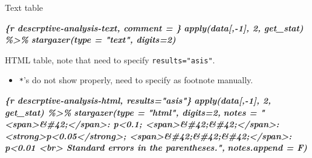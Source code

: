 \documentclass[
  a4paper,
  twoside,
  openright]{book}
\newenvironment{Shaded}{\begin{snugshade}}{\end{snugshade}}
\newcommand{\InformationTok}[1]{\textcolor[rgb]{0.56,0.35,0.01}{\textbf{\textit{#1}}}}
\providecommand{\tightlist}{%
  \setlength{\itemsep}{0pt}\setlength{\parskip}{0pt}}
\theoremstyle{definition}
\theoremstyle{definition}
\theoremstyle{definition}
\theoremstyle{definition}
\theoremstyle{remark}
\begin{document}
Text table

\begin{Shaded}
\begin{Highlighting}[]
\InformationTok{\textasciigrave{}\textasciigrave{}\textasciigrave{}\{r descrptive{-}analysis{-}text, comment = \textquotesingle{}\textquotesingle{}\}}
\InformationTok{apply(data[,{-}1], 2, get\_stat) \%\textgreater{}\% }
\InformationTok{    stargazer(type = "text", digits=2)}
\InformationTok{\textasciigrave{}\textasciigrave{}\textasciigrave{}}
\end{Highlighting}
\end{Shaded}

HTML table, note that need to specify \texttt{results="asis"}.

\begin{itemize}
\tightlist
\item
  \texttt{*}'s do not show properly, need to specify as footnote manually.
\end{itemize}

\begin{Shaded}
\begin{Highlighting}[]
\InformationTok{\textasciigrave{}\textasciigrave{}\textasciigrave{}\{r descrptive{-}analysis{-}html, results="asis"\}}
\InformationTok{apply(data[,{-}1], 2, get\_stat) \%\textgreater{}\% }
\InformationTok{    stargazer(type = "html", digits=2, }
\InformationTok{              notes = "\textless{}span\textgreater{}\&\#42;\textless{}/span\textgreater{}: p\textless{}0.1; \textless{}span\textgreater{}\&\#42;\&\#42;\textless{}/span\textgreater{}: \textless{}strong\textgreater{}p\textless{}0.05\textless{}/strong\textgreater{}; \textless{}span\textgreater{}\&\#42;\&\#42;\&\#42;\textless{}/span\textgreater{}: p\textless{}0.01 \textless{}br\textgreater{} Standard errors in the parentheses.",}
\InformationTok{              notes.append = F)}
\InformationTok{\textasciigrave{}\textasciigrave{}\textasciigrave{}}
\end{Highlighting}
\end{Shaded}
\end{document}
